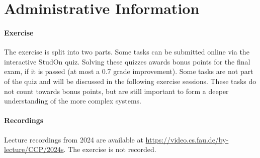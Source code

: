 \section{Administrative Information}
\label{sec:admin}

\paragraph{Exercise}
The exercise is split into two parts.
Some tasks can be submitted online via the interactive StudOn quiz.
Solving these quizzes awards bonus points for the final exam, if it is passed (at most a 0.7 grade improvement).
Some tasks are not part of the quiz and will be discussed in the following exercise sessions.
These tasks do not count towards bonus points, but are still important to form a deeper understanding of the more complex systems.

\paragraph{Recordings}
Lecture recordings from 2024 are available at \url{https://video.cs.fau.de/by-lecture/CCP/2024s}.
The exercise is not recorded.